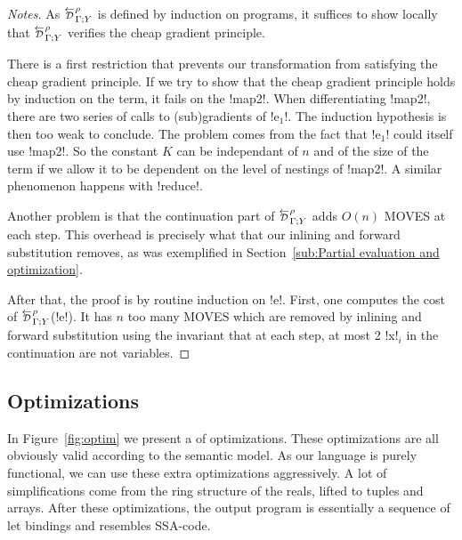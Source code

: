 \begin{proof}[Notes]
    As $\directD{\rho}{\Gamma}{Y}$ is defined by induction on programs, it suffices to show locally 
that $\directD{\rho}{\Gamma}{Y}$ verifies the cheap gradient principle. 

There is a first restriction that prevents our transformation from satisfying the cheap gradient principle.
If we try to show that the cheap gradient principle holds by induction on the term, it fails on the !map2!.
When differentiating !map2!, there are two series of calls to (sub)gradients of !e$_1$!. 
The induction hypothesis is then too weak to conclude. 
The problem comes from the fact that !e$_1$! could itself use !map2!. 
So the constant $K$ can be independant of $n$ and of 
the size of the term if we allow it to be dependent on the level of nestings of !map2!.
A similar phenomenon happens with !reduce!.

Another problem is that the continuation part of $\directD{\rho}{\Gamma}{Y}$ adds $O(n)$ MOVES at each step.
This overhead is precisely what that our inlining and forward substitution removes, 
as was exemplified in Section~\ref{sub:Partial evaluation and optimization}. 

After that, the proof is by routine induction on !e!. 
First, one computes the cost of $\directD{\rho}{\Gamma}{Y}$(!e!).
It has $n$ too many MOVES which are removed by inlining and forward substitution using the invariant that at each step, 
at most 2 !x!$_i$ in the continuation are not variables.
\end{proof}



\subsection{Optimizations} %
\label{sub:Optimizations}

In Figure~\ref{fig:optim} we present a of optimizations. 
These optimizations are all obviously valid according to the semantic model. 
As our language is purely functional, we can use these extra optimizations aggressively. 
A lot of simplifications come from the ring structure of the reals, lifted to tuples and arrays.
After these optimizations, the output program is essentially a sequence of let bindings 
and resembles SSA-code.

